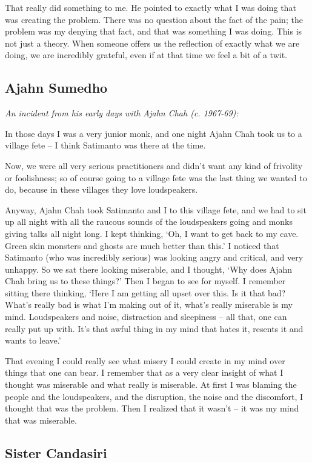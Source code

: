 That really did something to me. He pointed to exactly what I was doing
that was creating the problem. There was no question about the fact of
the pain; the problem was my denying that fact, and that was something I
was doing. This is not just a theory. When someone offers us the
reflection of exactly what we are doing, we are incredibly grateful, 
even if at that time we feel a bit of a twit. 

\subsection{Ajahn Sumedho}

\emph{An incident from his early days with Ajahn Chah (c. 1967-69):}

In those days I was a very junior monk, and one night Ajahn Chah took us
to a village fete -- I think Satimanto was there at the time. 

Now, we were all very serious practitioners and didn't want any kind of
frivolity or foolishness; so of course going to a village fete was the
last thing we wanted to do, because in these villages they love
loudspeakers. 

Anyway, Ajahn Chah took Satimanto and I to this village fete, and we had
to sit up all night with all the raucous sounds of the loudspeakers
going and monks giving talks all night long. I kept thinking, `Oh, I
want to get back to my cave. Green skin monsters and ghosts are much
better than this.' I noticed that Satimanto (who was incredibly serious) 
was looking angry and critical, and very unhappy. So we sat there
looking miserable, and I thought, `Why does Ajahn Chah bring us to these
things?' Then I began to see for myself. I remember sitting there
thinking, `Here I am getting all upset over this. Is it that bad? What's
really bad is what I'm making out of it, what's really miserable is my
mind. Loudspeakers and noise, distraction and sleepiness -- all that, 
one can really put up with. It's that awful thing in my mind that hates
it, resents it and wants to leave.'

That evening I could really see what misery I could create in my mind
over things that one can bear. I remember that as a very clear insight
of what I thought was miserable and what really is miserable. At first I
was blaming the people and the loudspeakers, and the disruption, the
noise and the discomfort, I thought that was the problem. Then I
realized that it wasn't -- it was my mind that was miserable. 

\subsection{Sister Candasiri}

